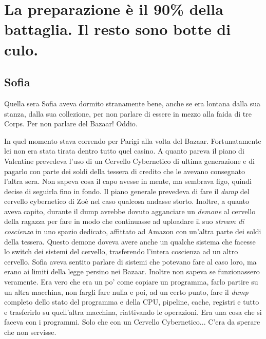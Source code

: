 \chapter{La preparazione è il 90\% della battaglia. Il resto sono botte di culo.}

  \section*{Sofia}

    Quella sera Sofia aveva dormito stranamente bene, anche se era lontana dalla sua stanza, dalla sua collezione, per
    non parlare di essere in mezzo alla faida di tre Corps. Per non parlare del Bazaar! Oddio.

    In quel momento stava correndo per Parigi alla volta del Bazaar. Fortunatamente lei non era stata tirata dentro
    tutto quel casino. A quanto pareva il piano di Valentine prevedeva l'uso di un Cervello Cybernetico di ultima
    generazione e di pagarlo con parte dei soldi della tessera di credito che le avevano consegnato l'altra sera. Non
    sapeva cosa il capo avesse in mente, ma sembrava figo, quindi decise di seguirla fino in fondo.
    Il piano generale prevedeva di fare il \emph{dump} del cervello cybernetico di Zoè nel caso qualcosa andasse storto.
    Inoltre, a quanto aveva capito, durante il dump avrebbe dovuto agganciare un \emph{demone} al cervello della ragazza
    per fare in modo che continuasse ad uploadare il suo \emph{stream di coscienza} in uno spazio dedicato, affittato
    ad Amazon con un'altra parte dei soldi della tessera. Questo demone doveva avere anche un qualche sistema che facesse lo
    switch dei sistemi del cervello, trasferendo l'intera coscienza ad un altro cervello. Sofia aveva sentito parlare di
    sistemi che potevano fare al caso loro, ma erano ai limiti della legge persino nei Bazaar. Inoltre non sapeva se
    funzionassero veramente. Era vero che era un po' come copiare un programma, farlo partire su un altra macchina, non
    fargli fare nulla e poi, ad un certo punto, fare il \emph{dump} completo dello stato del programma e della CPU,
    pipeline, cache, registri e tutto e trasferirlo su quell'altra macchina, riattivando le operazioni. Era una cosa che
    si faceva con i programmi. Solo che con un Cervello Cybernetico... C'era da sperare che non servisse.

